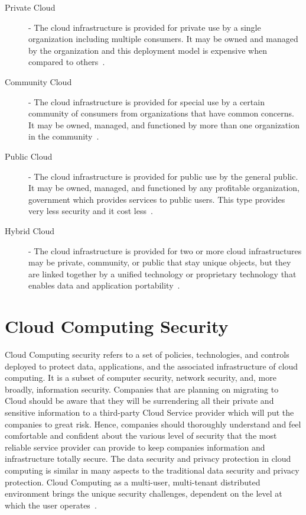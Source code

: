 \begin{description}


\item[Private Cloud]  - The cloud infrastructure is provided for private
use by a single organization including multiple consumers. It may be owned
and managed by the organization and this deployment model is expensive 
when compared to others~\cite{hid-sp18-513-cloud3}.

\item[Community Cloud] - The cloud infrastructure is provided for special use
by a certain community of consumers from organizations that have  common 
concerns. It may be owned, managed, and functioned by more than one 
organization in the community~\cite{hid-sp18-513-cloud3}.

\item[Public Cloud] - The cloud infrastructure is provided for public use by 
the general public. It may be owned, managed, and functioned by any profitable 
organization, government which provides services to public users. This type 
provides very less security and it cost less~\cite{hid-sp18-513-cloud3}.

\item[Hybrid Cloud] -  The cloud infrastructure is provided for two or 
more cloud infrastructures may be private, community, or public that stay 
unique objects, but they are linked together by a unified technology or 
proprietary technology that enables data and application 
portability~\cite{hid-sp18-513-cloud3}.

  
\end{description}

\section{Cloud Computing Security}
Cloud Computing security refers to a set of policies, technologies, 
and controls deployed to protect data, applications, and the associated
infrastructure of cloud computing. It is a subset of computer security, 
network security, and, more broadly, information security. Companies that
are planning on migrating to Cloud should be aware that they will be 
surrendering all their private and sensitive information to a third-party
Cloud Service provider which will put the companies to great risk. Hence, 
companies should thoroughly understand and feel comfortable and confident
about the various level of security that the most reliable service provider
can provide to keep companies information and infrastructure 
totally secure.
The data security and privacy protection in cloud computing is similar in 
many aspects to the traditional data security and privacy protection. 
Cloud Computing as a multi-user, multi-tenant distributed environment brings 
the unique security challenges, dependent on the level at which
the user operates~\cite{hid-sp18-513-zissis2012addressing}.

